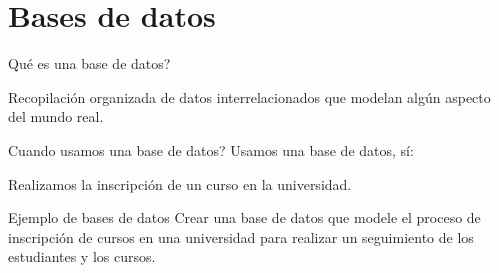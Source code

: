 \documentclass{beamer}
\begin{document}
  \section{Bases de datos}
 
 
 
 \begin{frame}{Qué es una base de datos?}
\begin{outline}
\1 Recopilación organizada de datos interrelacionados que
modelan algún aspecto del mundo real.
\end{outline}
 \end{frame}


 \begin{frame}{Cuando usamos una base de datos?}
 Usamos una base de datos, sí:
 \begin{outline}
 
 \1 Realizamos la inscripción de un curso en la universidad.
 \end{outline}
 \end{frame}
 
 \begin{frame}{Ejemplo de bases de datos}
 Crear una base de datos que modele el proceso de inscripción de cursos en una universidad
para realizar un seguimiento de los estudiantes y los cursos.

 \end{frame}
 
\end{document}
